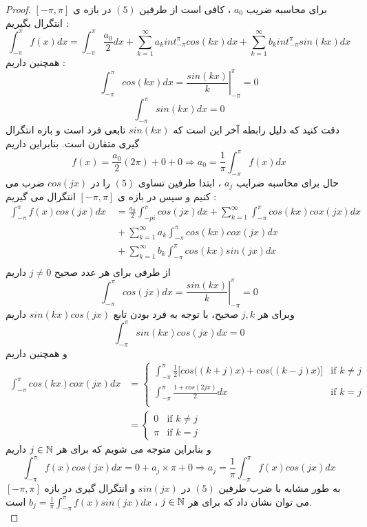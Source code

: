 \begin{proof}
	برای محاسبه ضریب
	$a_0$
	، کافی است از طرفین 
	$(5)$
	در بازه ی
	$[-\pi,\pi]$
	انتگرال بگیریم : 
	\[
	\int_{-\pi}^\pi {f(x)dx}=\int_{-\pi}^\pi{\frac{a_0}{2}}dx+\sum_{k=1}^\infty a_k{int_{-\pi}^\pi{cos(kx)dx}}+\sum_{k=1}^\infty b_k{int_{-\pi}^\pi{sin(kx)dx}}
	\]
	همچنین داریم :
	\[
	\int_{-\pi}^\pi{cos(kx)dx}=\left.\frac{sin(kx)}{k}\right |_{-\pi}^\pi=0
	\]
	\[
	\int_{-\pi}^\pi{sin(kx)dx}=0
	\]
	دقت کنید که دلیل رابطه آخر این است که
	$sin(kx)$
	تابعی فرد است و بازه انتگرال گیری متقارن است. بنابراین داریم
	\[
	f(x)=\frac{a_0}{2}(2\pi)+0+0\Rightarrow  a_0=\frac{1}{\pi}\int_{-\pi}^\pi {f(x)dx}
	\]
	حال برای محاسبه ضرایب 
	$a_j$
	، ابتدا طرفین تساوی 
	$(5)$
	را در 
	$cos(jx)$
	ضرب می کنیم و سپس در بازه ی 
	$[-\pi,\pi]$
	انتگرال می گیریم :
	\begin{equation*}
		\begin{aligned}
			\int_{-\pi}^\pi{f(x)cos(jx)dx} {} &\ =\frac{a_0}{2}\int_{-pi}^\pi{cos(jx)dx}+\sum_{k=1}^\infty{\int_{-\pi}^\pi{cos(kx)cox(jx)dx}} \\
			&\ +\sum_{k=1}^\infty{a_k\int_{-\pi}^\pi{cos(kx)cox(jx)dx}} \\
			&\ +\sum_{k=1}^\infty{b_k\int_{-\pi}^\pi{cos(kx)sin(jx)dx}} \\
		\end{aligned}
	\end{equation*}
	از طرفی برای هر عدد صحیح
	$j\ne0$
	داریم
	\[
	\int_{-\pi}^\pi{cos(jx)dx}=\left.{\frac{sin(kx)}{k}}\right |_{-\pi}^\pi=0
	\]
	وبرای هر 
	$j,k$
	صحیح، با توجه به فرد بودن تابع
	$sin(kx)cos(jx)$
	داریم
	\[
	\int_{-\pi}^\pi{sin(kx)cos(jx)dx}=0
	\]
	و همچنین داریم
	\begin{align*}
		\int_{-\pi}^\pi{cos(kx)cox(jx)dx}&=
		\begin{cases}
			\int_{-\pi}^\pi{\frac{1}{2}\Big[cos\big((k+j)x\big)+cos\big((k-j)x\big)\Big]} &\mbox{if } k\ne j\\
			\int_{-\pi}^\pi{\frac{1+cos(2jx)}{2}dx}   
			&\mbox{if } k=j\\
		\end{cases}
		\\
		&=\begin{cases}
			0 &\mbox{if } k\ne j
			\\
			\pi &\mbox{if } k=j
		\end{cases}
	\end{align*}
	و بنابراین متوجه می شویم که برای هر 
	$j\in\mathbb{N}$
	داریم
	\[
	\int_{-\pi}^\pi{f(x)cos(jx)dx} {} = 0+a_j\times\pi+0\Rightarrow a_j=\frac{1}{\pi}\int_{-\pi}^\pi{f(x)cos(jx)dx}
	\]
	به طور مشابه با ضرب طرفین
	$(5)$
	در
	$sin(jx)$
	و انتگرال گیری در بازه
	$[-\pi,\pi]$
	می توان نشان داد که برای هر 
	$j\in\mathbb{N}$
	،
	$b_j=\frac{1}{\pi}\int_{-\pi}^\pi{f(x)sin(jx)dx}$
	است.\\
\end{proof}

